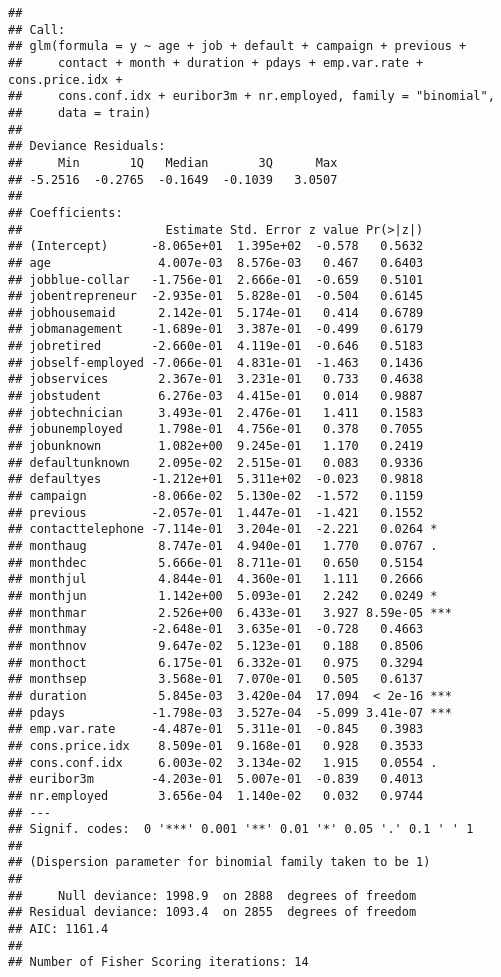 \documentclass[
]{article}
\begin{document}
\begin{verbatim}
## 
## Call:
## glm(formula = y ~ age + job + default + campaign + previous + 
##     contact + month + duration + pdays + emp.var.rate + cons.price.idx + 
##     cons.conf.idx + euribor3m + nr.employed, family = "binomial", 
##     data = train)
## 
## Deviance Residuals: 
##     Min       1Q   Median       3Q      Max  
## -5.2516  -0.2765  -0.1649  -0.1039   3.0507  
## 
## Coefficients:
##                    Estimate Std. Error z value Pr(>|z|)    
## (Intercept)      -8.065e+01  1.395e+02  -0.578   0.5632    
## age               4.007e-03  8.576e-03   0.467   0.6403    
## jobblue-collar   -1.756e-01  2.666e-01  -0.659   0.5101    
## jobentrepreneur  -2.935e-01  5.828e-01  -0.504   0.6145    
## jobhousemaid      2.142e-01  5.174e-01   0.414   0.6789    
## jobmanagement    -1.689e-01  3.387e-01  -0.499   0.6179    
## jobretired       -2.660e-01  4.119e-01  -0.646   0.5183    
## jobself-employed -7.066e-01  4.831e-01  -1.463   0.1436    
## jobservices       2.367e-01  3.231e-01   0.733   0.4638    
## jobstudent        6.276e-03  4.415e-01   0.014   0.9887    
## jobtechnician     3.493e-01  2.476e-01   1.411   0.1583    
## jobunemployed     1.798e-01  4.756e-01   0.378   0.7055    
## jobunknown        1.082e+00  9.245e-01   1.170   0.2419    
## defaultunknown    2.095e-02  2.515e-01   0.083   0.9336    
## defaultyes       -1.212e+01  5.311e+02  -0.023   0.9818    
## campaign         -8.066e-02  5.130e-02  -1.572   0.1159    
## previous         -2.057e-01  1.447e-01  -1.421   0.1552    
## contacttelephone -7.114e-01  3.204e-01  -2.221   0.0264 *  
## monthaug          8.747e-01  4.940e-01   1.770   0.0767 .  
## monthdec          5.666e-01  8.711e-01   0.650   0.5154    
## monthjul          4.844e-01  4.360e-01   1.111   0.2666    
## monthjun          1.142e+00  5.093e-01   2.242   0.0249 *  
## monthmar          2.526e+00  6.433e-01   3.927 8.59e-05 ***
## monthmay         -2.648e-01  3.635e-01  -0.728   0.4663    
## monthnov          9.647e-02  5.123e-01   0.188   0.8506    
## monthoct          6.175e-01  6.332e-01   0.975   0.3294    
## monthsep          3.568e-01  7.070e-01   0.505   0.6137    
## duration          5.845e-03  3.420e-04  17.094  < 2e-16 ***
## pdays            -1.798e-03  3.527e-04  -5.099 3.41e-07 ***
## emp.var.rate     -4.487e-01  5.311e-01  -0.845   0.3983    
## cons.price.idx    8.509e-01  9.168e-01   0.928   0.3533    
## cons.conf.idx     6.003e-02  3.134e-02   1.915   0.0554 .  
## euribor3m        -4.203e-01  5.007e-01  -0.839   0.4013    
## nr.employed       3.656e-04  1.140e-02   0.032   0.9744    
## ---
## Signif. codes:  0 '***' 0.001 '**' 0.01 '*' 0.05 '.' 0.1 ' ' 1
## 
## (Dispersion parameter for binomial family taken to be 1)
## 
##     Null deviance: 1998.9  on 2888  degrees of freedom
## Residual deviance: 1093.4  on 2855  degrees of freedom
## AIC: 1161.4
## 
## Number of Fisher Scoring iterations: 14
\end{verbatim}
\end{document}
